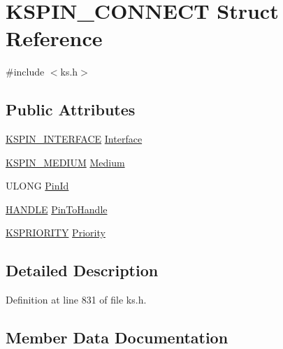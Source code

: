 \hypertarget{struct_k_s_p_i_n___c_o_n_n_e_c_t}{}\section{K\+S\+P\+I\+N\+\_\+\+C\+O\+N\+N\+E\+CT Struct Reference}
\label{struct_k_s_p_i_n___c_o_n_n_e_c_t}


{\ttfamily \#include $<$ks.\+h$>$}

\subsection*{Public Attributes}
\begin{DoxyCompactItemize}
\item 
\hyperlink{ks_8h_adc19b00535ad29d2d9baddb0a0c36f9d}{K\+S\+P\+I\+N\+\_\+\+I\+N\+T\+E\+R\+F\+A\+CE} \hyperlink{struct_k_s_p_i_n___c_o_n_n_e_c_t_aca90775277dde1fe8aaa75edc9765861}{Interface}
\item 
\hyperlink{ks_8h_a1e8ded652cd6544c903137c8e662d69f}{K\+S\+P\+I\+N\+\_\+\+M\+E\+D\+I\+UM} \hyperlink{struct_k_s_p_i_n___c_o_n_n_e_c_t_abd088c63e52c5afd0540c87e5a4628f5}{Medium}
\item 
U\+L\+O\+NG \hyperlink{struct_k_s_p_i_n___c_o_n_n_e_c_t_a9852ce959cb95c7ced5fe0ed831835f2}{Pin\+Id}
\item 
\hyperlink{_sound_touch_d_l_l_8h_aa8c0374618b33785ccb02f74bcfebc46}{H\+A\+N\+D\+LE} \hyperlink{struct_k_s_p_i_n___c_o_n_n_e_c_t_ad56938812e02c27dd423d4f31d1173eb}{Pin\+To\+Handle}
\item 
\hyperlink{struct_k_s_p_r_i_o_r_i_t_y}{K\+S\+P\+R\+I\+O\+R\+I\+TY} \hyperlink{struct_k_s_p_i_n___c_o_n_n_e_c_t_ac1719e3d12053516b9a1920d7fb1ff36}{Priority}
\end{DoxyCompactItemize}


\subsection{Detailed Description}


Definition at line 831 of file ks.\+h.



\subsection{Member Data Documentation}
